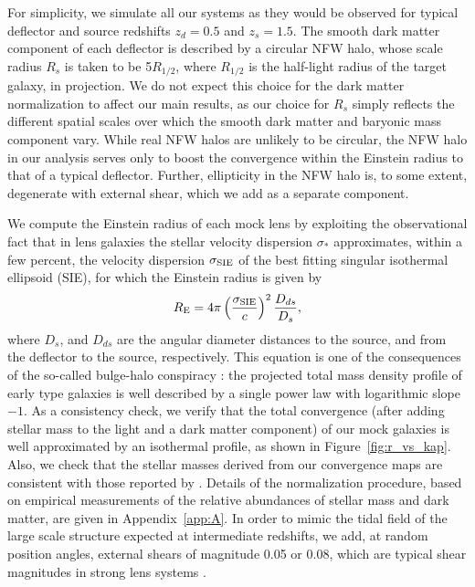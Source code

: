 For simplicity, we simulate all our systems as they would be observed for typical deflector and source redshifts $z_{d}=0.5$ and $z_{s}=1.5$. The smooth dark matter component of each deflector is described by a circular NFW halo, whose scale radius $R_s$ is taken to be 5$R_{1/2}$, where $R_{1/2}$ is the half-light radius of the target galaxy, in projection. We do not expect this choice for the dark matter normalization to affect our main results, as our choice for $R_s$ simply reflects the different spatial scales over which the smooth dark matter and baryonic mass component vary. While real NFW halos are unlikely to be circular, the NFW halo in our analysis serves only to boost the convergence within the Einstein radius to that of a typical deflector. Further, ellipticity in the NFW halo is, to some extent, degenerate with external shear, which we add as a separate component.

We compute the Einstein radius of each mock lens by exploiting the observational fact \cite{Tre++06,Koo++09} that in lens galaxies the stellar velocity dispersion $\sigma_*$ approximates, within a few percent, the velocity dispersion $\sigma_{\rm{SIE}}$ of the best fitting singular isothermal ellipsoid (SIE), for which the Einstein radius is given by
\begin{equation}
R_{\rm E} = 4\pi\left(\frac{\sigma_{\rm{SIE}}}{c}\right)^2\frac{D_{ds}}{D_s},
\end{equation} 
where $D_s$, and $D_{ds}$ are the angular diameter distances to the source, and from the deflector to the source, respectively. This equation is one of the consequences of the so-called bulge-halo conspiracy \cite{T+K02a,T+K04,Koo++06,Koo++09,D+T14}: the projected total mass density profile of early type galaxies is well described by a single power law with logarithmic slope $-1$. As a consistency check, we verify that the total convergence (after adding stellar mass to the light and a dark matter component) of our mock galaxies is well approximated by an isothermal profile, as shown in Figure~\ref{fig:r_vs_kap}. Also, we check that the stellar masses derived from our convergence maps are consistent with those reported by \cite{Gal++08b}. Details of the normalization procedure, based on empirical measurements of the relative abundances of stellar mass and dark matter, are given in Appendix~\ref{app:A}. 
In order to mimic the tidal field of the large scale structure expected at intermediate redshifts, we add, at random position angles, external shears of magnitude 0.05 or 0.08, which are typical shear magnitudes in strong lens systems \cite{H+S03}. 
